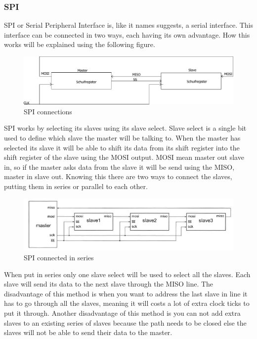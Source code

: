 \documentclass[10pt,a4paper]{article}
\begin{document}
\subsubsection{SPI}
SPI or Serial Peripheral Interface is, like it names suggests, a serial interface. This interface can be connected in two ways, each having its own advantage. How this works will be explained using the following figure.
\begin{figure}[H]
        \centering
        \graphicspath{ {./images/} }
        \includegraphics[scale=.4]{SPI}
        \caption{SPI connections}
        \label{fig:SPIconnections}
\end{figure}
SPI works by selecting its slaves using its slave select. Slave select is a single bit used to define which slave the master will be talking to. When the master has selected its slave it will be able to shift its data from its shift register into the shift register of the slave using the MOSI output. MOSI mean master out slave in, so if the master asks data from the slave it will be send using the MISO, master in slave out. Knowing this there are two ways to connect the slaves, putting them in series or parallel to each other. 
\begin{figure}[H]
        \centering
        \graphicspath{ {./images/} }
        \includegraphics[scale=.4]{SPIserie}
        \caption{SPI connected in series}
        \label{fig:SPIseries}
\end{figure}
When put in series only one slave select will be used to select all the slaves. Each slave will send its data to the next slave through the MISO line. The disadvantage of this method is when you want to address the last slave in line it has to go through all the slaves, meaning it will costs a lot of extra clock ticks to put it through. Another disadvantage of this method is you can not add extra slaves to an existing series of slaves because the path needs to be closed else the slaves will not be able to send their data to the master.
\end{document}
